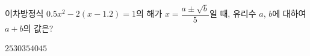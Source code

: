 이차방정식 $0.5x^2-2(x-1.2)=1$의 해가 $x=\dfrac{a\pm\sqrt{b}}{5}$일 때, 유리수 $a$, $b$에 대하여 $a+b$의 값은?
\begin{choices32}{$25$}{$30$}{$35$}{$40$}{$45$}\end{choices32}
